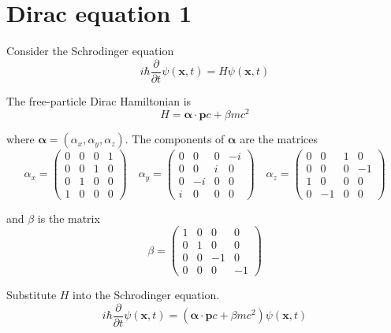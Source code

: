 

\section*{Dirac equation 1}

Consider the Schrodinger equation
\begin{equation*}
i\hbar\frac{\partial}{\partial t}\psi(\mathbf x,t)=H\psi(\mathbf x,t)
\end{equation*}

The free-particle Dirac Hamiltonian is
\begin{equation*}
H=\boldsymbol\alpha\cdot\mathbf pc+\beta mc^2
\end{equation*}

where $\boldsymbol\alpha=(\alpha_x,\alpha_y,\alpha_z)$.
The components of $\boldsymbol\alpha$ are the matrices
\begin{equation*}
\alpha_x=\begin{pmatrix}
0&0&0&1\\
0&0&1&0\\
0&1&0&0\\
1&0&0&0
\end{pmatrix}
\quad
\alpha_y=\begin{pmatrix}
0&0&0&-i\\
0&0&i&0\\
0&-i&0&0\\
i&0&0&0
\end{pmatrix}
\quad
\alpha_z=\begin{pmatrix}
0&0&1&0\\
0&0&0&-1\\
1&0&0&0\\
0&-1&0&0
\end{pmatrix}
\end{equation*}

and $\beta$ is the matrix
\begin{equation*}
\beta=\begin{pmatrix}
1&0&0&0\\
0&1&0&0\\
0&0&-1&0\\
0&0&0&-1
\end{pmatrix}
\end{equation*}

Substitute $H$ into the Schrodinger equation.
\begin{equation*}
i\hbar\frac{\partial}{\partial t}\psi(\mathbf x,t)
=(\boldsymbol\alpha\cdot\mathbf pc+\beta mc^2)\psi(\mathbf x,t)
\end{equation*}

